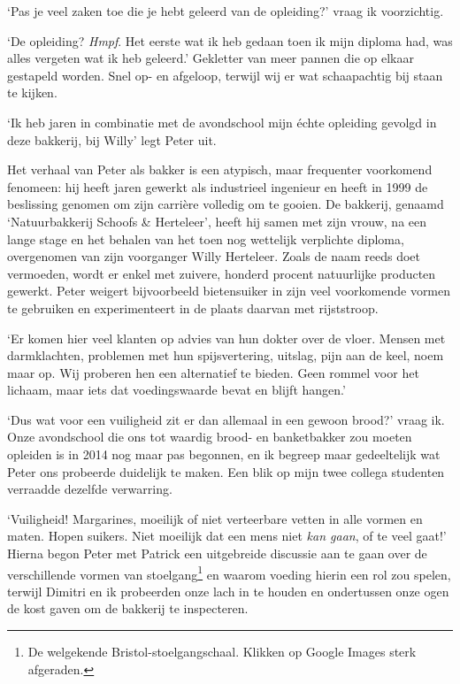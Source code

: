 \documentclass[
  11pt,
  dutch,
]{memoir}
\begin{document}
`Pas je veel zaken toe die je hebt geleerd van de opleiding?' vraag ik
voorzichtig.

`De opleiding? \emph{Hmpf}. Het eerste wat ik heb gedaan toen ik mijn
diploma had, was alles vergeten wat ik heb geleerd.' Gekletter van meer
pannen die op elkaar gestapeld worden. Snel op- en afgeloop, terwijl wij
er wat schaapachtig bij staan te kijken.

`Ik heb jaren in combinatie met de avondschool mijn échte opleiding
gevolgd in deze bakkerij, bij Willy' legt Peter uit.

Het verhaal van Peter als bakker is een atypisch, maar frequenter
voorkomend fenomeen: hij heeft jaren gewerkt als industrieel ingenieur
en heeft in 1999 de beslissing genomen om zijn carrière volledig om te
gooien. De bakkerij, genaamd `Natuurbakkerij Schoofs \& Herteleer',
heeft hij samen met zijn vrouw, na een lange stage en het behalen van
het toen nog wettelijk verplichte diploma, overgenomen van zijn
voorganger Willy Herteleer. Zoals de naam reeds doet vermoeden, wordt er
enkel met zuivere, honderd procent natuurlijke producten gewerkt. Peter
weigert bijvoorbeeld bietensuiker in zijn veel voorkomende vormen te
gebruiken en experimenteert in de plaats daarvan met rijststroop.

`Er komen hier veel klanten op advies van hun dokter over de vloer.
Mensen met darmklachten, problemen met hun spijsvertering, uitslag, pijn
aan de keel, noem maar op. Wij proberen hen een alternatief te bieden.
Geen rommel voor het lichaam, maar iets dat voedingswaarde bevat en
blijft hangen.'

`Dus wat voor een vuiligheid zit er dan allemaal in een gewoon brood?'
vraag ik. Onze avondschool die ons tot waardig brood- en banketbakker
zou moeten opleiden is in 2014 nog maar pas begonnen, en ik begreep maar
gedeeltelijk wat Peter ons probeerde duidelijk te maken. Een blik op
mijn twee collega studenten verraadde dezelfde verwarring.

`Vuiligheid! Margarines, moeilijk of niet verteerbare vetten in alle
vormen en maten. Hopen suikers. Niet moeilijk dat een mens niet
\emph{kan gaan}, of te veel gaat!' Hierna begon Peter met Patrick een
uitgebreide discussie aan te gaan over de verschillende vormen van
stoelgang\footnote{De welgekende Bristol-stoelgangschaal. Klikken op
  Google Images sterk afgeraden.} en waarom voeding hierin een rol zou
spelen, terwijl Dimitri en ik probeerden onze lach in te houden en
ondertussen onze ogen de kost gaven om de bakkerij te inspecteren.
\end{document}
